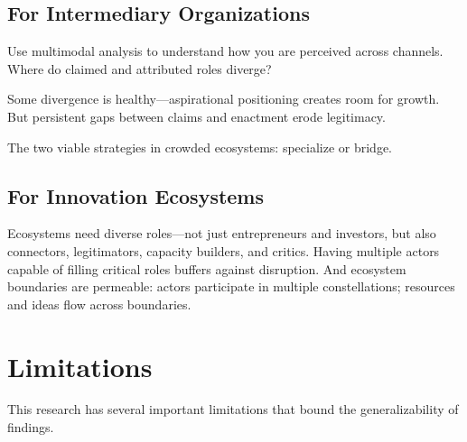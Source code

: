 \documentclass[../main.tex]{subfiles}
\begin{document}
\subsection{For Intermediary Organizations}

\begin{description}[leftmargin=0.5cm, itemsep=0.3em]
\item[Know your position.] Use multimodal analysis to understand how you are perceived across channels. Where do claimed and attributed roles diverge?
\item[Manage gaps strategically.] Some divergence is healthy---aspirational positioning creates room for growth. But persistent gaps between claims and enactment erode legitimacy.
\item[Differentiate or connect.] The two viable strategies in crowded ecosystems: specialize or bridge.
\end{description}

\subsection{For Innovation Ecosystems}

Ecosystems need diverse roles---not just entrepreneurs and investors, but also connectors, legitimators, capacity builders, and critics. Having multiple actors capable of filling critical roles buffers against disruption. And ecosystem boundaries are permeable: actors participate in multiple constellations; resources and ideas flow across boundaries.

\section{Limitations}

This research has several important limitations that bound the generalizability of findings.
\end{document}
